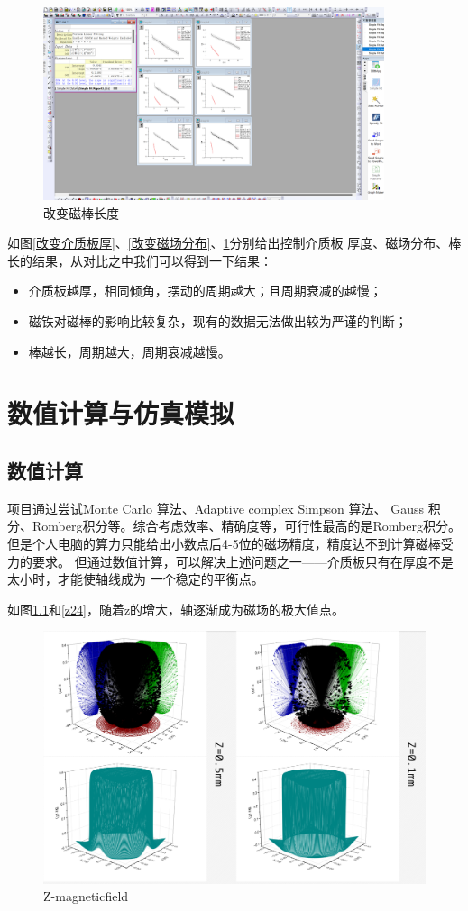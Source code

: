 \documentclass[AutoFakeBold]{LZUThesis}
\begin{document}
\begin{figure}[H]
    \centering
    \includegraphics[width=10cm]{figures/棒长.png}
    \caption{改变磁棒长度}
    \label{改变磁棒长度}
\end{figure}
如图\ref{改变介质板厚}、\ref{改变磁场分布}、\ref{改变磁棒长度}分别给出控制介质板
厚度、磁场分布、棒长的结果，从对比之中我们可以得到一下结果：
\begin{itemize}
    \item 介质板越厚，相同倾角，摆动的周期越大；且周期衰减的越慢；
    \item 磁铁对磁棒的影响比较复杂，现有的数据无法做出较为严谨的判断；
    \item 棒越长，周期越大，周期衰减越慢。
\end{itemize}


\chapter{数值计算与仿真模拟}
\section{数值计算}
项目通过尝试Monte Carlo 算法、Adaptive complex Simpson 算法、
Gauss 积分、Romberg积分等\cite{Numerical_Analysis}。综合考虑效率、精确度等，可行性最高的是Romberg积分。
但是个人电脑的算力只能给出小数点后4-5位的磁场精度，精度达不到计算磁棒受力的要求。
但通过数值计算，可以解决上述问题之一——介质板只有在厚度不是太小时，才能使轴线成为
一个稳定的平衡点。

如图\ref{zmag}和\ref{z24}，随着z的增大，轴逐渐成为磁场的极大值点。
\begin{figure}[H]
    \centering
    \includegraphics[width=12cm]{figures/Zmag.png}
    \caption{Z-magneticfield}
    \label{zmag}
\end{figure}
\end{document}
